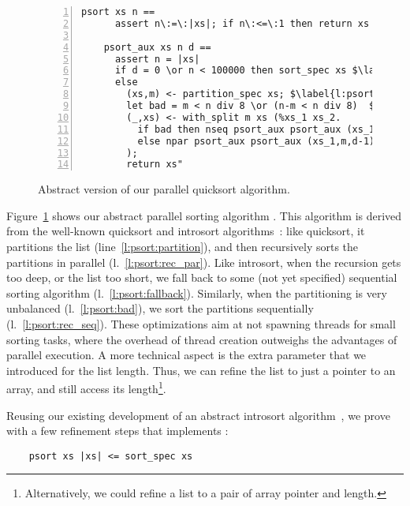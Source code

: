\documentclass[sn-mathphys,Numbered]{sn-jnl}
\theoremstyle{thmstyleone}%
\theoremstyle{definition}%
\theoremstyle{thmstylethree}%
\begin{document}
  \begin{figure}
  \begin{lstlisting}[numbers=left,xleftmargin=1.9em,frame=single,framexleftmargin=.5em]
    psort xs n ==
      assert n\:=\:|xs|; if n\:<=\:1 then return xs else psort_aux$\hspace*{-1pt}$ xs$\hspace*{-1pt}$ n$\hspace*{-1pt}$ (log2$\hspace*{-1pt}$ n$\hspace*{-1pt}$ *$\hspace*{-1pt}$ 2)

    psort_aux xs n d ==
      assert n = |xs|
      if d = 0 \or n < 100000 then sort_spec xs $\label{l:psort:fallback}$
      else
        (xs,m) <- partition_spec xs; $\label{l:psort:partition}$
        let bad = m < n div 8 \or (n-m < n div 8)  $\label{l:psort:bad}$
        (_,xs) <- with_split m xs (%xs_1 xs_2.
          if bad then nseq psort_aux psort_aux (xs_1,m,d-1) (xs_2,n-m,d-1) $\label{l:psort:rec_seq}$
          else npar psort_aux psort_aux (xs_1,m,d-1) (xs_2,n-m,d-1)  $\label{l:psort:rec_par}$
        );
        return xs"
  \end{lstlisting}
  \caption{Abstract version of our parallel quicksort algorithm.}\label{fig:psort}
  \end{figure}

  Figure~\ref{fig:psort} shows our abstract parallel sorting algorithm .
  This algorithm is derived from the well-known quicksort and introsort algorithms~\cite{Muss97}:
  like quicksort, it partitions the list (line~\ref{l:psort:partition}), and then recursively sorts the partitions in parallel (l.~\ref{l:psort:rec_par}).
  Like introsort, when the recursion gets too deep, or the list too short, we fall back to
  some (not yet specified) sequential sorting algorithm (l.~\ref{l:psort:fallback}). Similarly, when the partitioning is very unbalanced (l.~\ref{l:psort:bad}),
  we sort the partitions sequentially (l.~\ref{l:psort:rec_seq}). These optimizations aim at not spawning threads for small sorting tasks, where
  the overhead of thread creation outweighs the advantages of parallel execution.
  A more technical aspect is the extra parameter  that we introduced for the list length.
  Thus, we can refine the list to just a pointer to an array, and still access its length\footnote{Alternatively, we could refine a list to a pair of array pointer and length.}.

  Reusing our existing development of an abstract introsort algorithm~\cite{La20},
  we prove with a few refinement steps that  implements :
  \begin{lstlisting}
    psort xs |xs| <= sort_spec xs
  \end{lstlisting}
\end{document}
